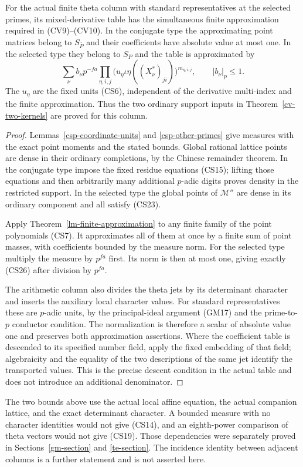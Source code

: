 
\begin{theorem}\label{csp-two-supports}
For the actual finite theta column with standard
representatives at the selected primes, its mixed-derivative
table has the simultaneous finite approximation required
in (CV9)--(CV10).  In the conjugate type the approximating
point matrices belong to $S_{\bar P}$ and their coefficients
have absolute value at most one.  In the selected type
they belong to $S_P$ and the table is approximated by
\[
       \sum_\nu b_\nu p^{-fa}
             \prod_{\eta,i,j}
                \bigl(u_\eta\iota\eta((X_\nu^*)_{ji})\bigr)^{m_{\eta,i,j}},
                        \qquad |b_\nu|_p\le1.               \tag{CS26}
\]
The $u_\eta$ are the fixed units (CS6), independent of the
derivative multi-index and the finite approximation.  Thus
the two ordinary support inputs in
Theorem~\ref{cv-two-kernels} are proved for this column.
\end{theorem}
\begin{proof}
Lemmas~\ref{csp-coordinate-units} and
\ref{csp-other-primes} give measures with the exact point
moments and the stated bounds.  Global rational lattice
points are dense in their ordinary completions, by the
Chinese remainder theorem.  In the conjugate type impose
the fixed residue equations (CS15); lifting those equations
and then arbitrarily many additional $p$-adic digits proves
density in the restricted support.  In the selected type
the global points of $\mathcal M''$ are dense in its
ordinary component and all satisfy (CS23).

Apply Theorem~\ref{lm-finite-approximation} to any finite
family of the point polynomials (CS7).  It approximates
all of them at once by a finite sum of point masses,
with coefficients bounded by the measure norm.
For the selected type multiply the measure by $p^{fa}$
first.  Its norm is then at most one, giving exactly
(CS26) after division by $p^{fa}$.

The arithmetic column also divides the theta jets by its
determinant character and inserts the auxiliary local
character values.  For standard representatives these
are $p$-adic units, by the principal-ideal argument
(GM17) and the prime-to-$p$ conductor condition.  The
normalization is therefore a scalar of absolute value
one and preserves both approximation assertions.
Where the coefficient table is descended to its specified
number field, apply the fixed embedding of that field;
algebraicity and the equality of the two descriptions of
the same jet identify the transported values.  This is
the precise descent condition in the actual table and
does not introduce an additional denominator.
\end{proof}

The two bounds above use the actual local affine equation,
the actual companion lattice, and the exact determinant
character.  A bounded measure with no character identities
would not give (CS14), and an eighth-power comparison of
theta vectors would not give (CS19).  Those dependencies
were separately proved in Sections~\ref{gm-section} and
\ref{te-section}.  The incidence identity between adjacent
columns is a further statement and is not asserted here.


